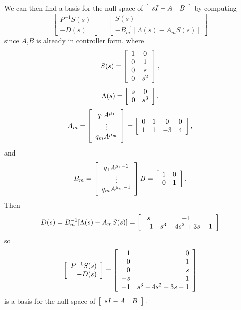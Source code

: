 \documentclass{article}
\begin{document}
We can then find a basis for the null space of
$\left[\begin{array}{c c}
  sI - A & B
\end{array}\right]$ by computing
$$
\left[\begin{array}{c}
   P^{-1} S(s) \\
  -D(s)
\end{array}\right] =
\left[\begin{array}{c}
   S(s) \\
  -B_m^{-1}[\Lambda(s) - A_m S(s)]
\end{array}\right]
$$
since $A$,$B$ is already in controller form.
where
$$
S(s) =
  \left[\begin{array}{c c}
    1 & 0 \\
    0 & 1 \\
    0 & s \\
    0 & s^2
  \end{array}\right],
$$
$$
\Lambda(s) =
  \left[\begin{array}{c c}
    s & 0   \\
    0 & s^3
  \end{array}\right],
$$
$$
A_m =
\left[\begin{array}{c}
  q_1 A^{\mu_1} \\
  \vdots      \\
  q_m A^{\mu_m}
\end{array}\right]
=
\left[\begin{array}{c c c c}
  0 & 1 &  0 & 0 \\
  1 & 1 & -3 & 4
\end{array}\right],
$$
and
$$
B_m =
\left[\begin{array}{c}
  q_1 A^{\mu_1 - 1} \\
  \vdots         \\
  q_m A^{\mu_m - 1}
\end{array}\right] B =
  \left[\begin{array}{c c}
    1 &  0 \\
    0 &  1
  \end{array}\right].
$$
Then
$$
D(s) =
B_m^{-1} [\Lambda(s) - A_m S(s)] =
  \left[\begin{array}{c c}
     s & -1 \\
    -1 & s^3 - 4s^2 + 3s - 1
  \end{array}\right]
$$
so
$$
\left[\begin{array}{r}
   P^{-1} S(s) \\
  -D(s)
\end{array}\right] =
\left[\begin{array}{r r}
  1 &  0 \\
  0 &  1 \\
  0 &  s \\
 -s &  1 \\
 -1 &  s^3 -  4s^2 + 3s - 1
\end{array}\right]
$$
is a basis for the null space of
$
\left[\begin{array}{c c}
  sI - A & B
\end{array}\right].
$
\end{document}
